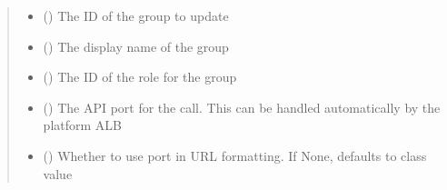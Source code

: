 \documentclass[letterpaper,10pt,english]{sphinxmanual}
\begin{document}
\begin{fulllineitems}
\begin{fulllineitems}
\begin{sphinxVerbatim}[commandchars=\\\{\}]
 
  
\end{sphinxVerbatim}
\begin{quote}\begin{description}
\begin{itemize}
\item {} 
\sphinxAtStartPar
{} () \textendash{} The ID of the group to update

\item {} 
\sphinxAtStartPar
{} () \textendash{} The display name of the group

\item {} 
\sphinxAtStartPar
{} () \textendash{} The ID of the role for the group

\item {} 
\sphinxAtStartPar
{} (\sphinxstyleliteralemphasis{\sphinxupquote{ (}}\sphinxstyleliteralemphasis{\sphinxupquote{)}}) \textendash{} The API port for the call. This can be handled automatically by the platform ALB

\item {} 
\sphinxAtStartPar
{} (\sphinxstyleliteralemphasis{\sphinxupquote{ (}}\sphinxstyleliteralemphasis{\sphinxupquote{)}}) \textendash{} Whether to use port in URL formatting. If None, defaults to class value


\end{itemize}
\end{description}
\end{quote}
\end{fulllineitems}
\end{fulllineitems}
\end{document}
